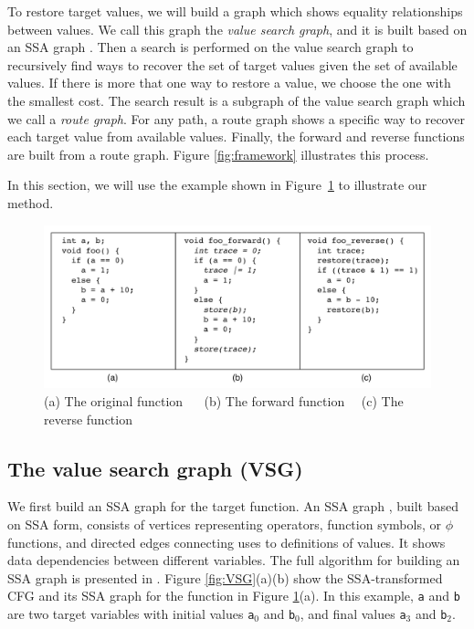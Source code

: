 \documentclass[12pt]{gatech-thesis}
\begin{document}
To restore target values, we will build a graph which shows equality relationships between values. 
We call this graph the \emph{value search graph}, and it is built based on an SSA graph \cite{Alpern1988,Cooper2001}. 
Then a search is performed on the value search graph to recursively find ways to recover the set of target values given the set of available values. 
If there is more that one way to restore a value, we choose the one with the smallest cost. 
The search result is a subgraph of the value search graph which we call a \emph{route graph}. 
For any path, a route graph shows a specific way to recover each target value from available values. 
Finally, the forward and reverse functions are built from a route graph. 
Figure \ref{fig:framework} illustrates this process.

In this section, we will use the example shown in Figure~\ref{fig:code_example} to illustrate our method.


\begin{figure}
\centering
\includegraphics[width=400pt]{figures1/CodeExample.pdf}
\caption{(a) The original function $\quad$ (b) The forward function$\quad$ (c) The reverse function}
\label{fig:code_example}
\end{figure}

\subsection{The value search graph (VSG)}
We first build an SSA graph for the target function.
An SSA graph \cite{Alpern1988,Cooper2001}, built based on SSA form, consists of vertices representing operators, function symbols, or $\phi$ functions, and directed edges connecting uses to definitions of values. It shows data dependencies between different variables. 
The full algorithm for building an SSA graph is presented in \cite{Muchnick}. 
Figure \ref{fig:VSG}(a)(b) show the SSA-transformed CFG and its SSA graph for the function in Figure \ref{fig:code_example}(a). In this example, \texttt{a} and \texttt{b} are two target variables with initial values \texttt{a$_0$} and \texttt{b$_0$}, and final values \texttt{a$_3$} and \texttt{b$_2$}.
\end{document}
